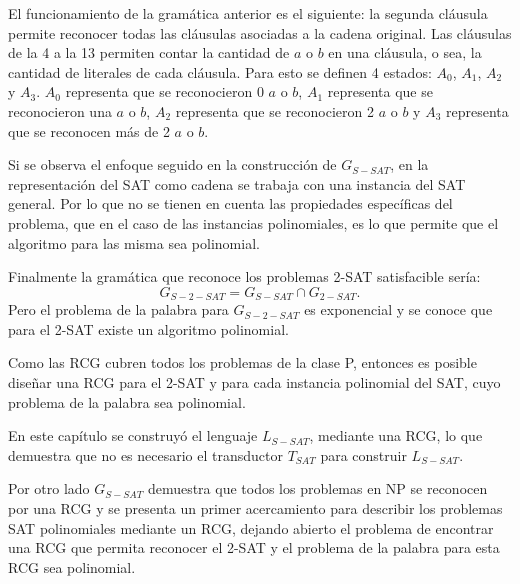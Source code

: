 \documentclass[12pt]{article}
\begin{document}
El funcionamiento de la gramática anterior es el siguiente: la segunda cláusula permite reconocer todas las
cláusulas asociadas a la cadena original. Las cláusulas de la 4 a la 13 permiten contar la cantidad de $a$ o $b$ en
una cláusula, o sea, la cantidad de literales de cada cláusula. Para esto se definen 4 estados: $A_0$, $A_1$, $A_2$ y $A_3$.
$A_0$ representa que se reconocieron 0 $a$ o $b$, $A_1$ representa que se reconocieron una $a$ o $b$, $A_2$
representa que se reconocieron 2 $a$ o $b$ y  $A_3$ representa que se reconocen más de 2 $a$ o $b$.

Si se observa el enfoque seguido en la construcción de $G_{S-SAT}$, en la representación del SAT como cadena se
trabaja con una instancia del SAT general. Por lo que no se tienen en cuenta las propiedades específicas
del problema, que en el caso de las instancias polinomiales, es lo que permite que el algoritmo para
las misma sea polinomial.

Finalmente la gramática que reconoce los problemas 2-SAT satisfacible sería:
$$G_{S-2-SAT}=G_{S-SAT}\cap G_{2-SAT}.$$
Pero el problema de la palabra para $G_{S-2-SAT}$ es exponencial y se conoce que para el 2-SAT existe un algoritmo
polinomial.

Como las RCG cubren todos los problemas de la clase P, entonces es posible
diseñar una RCG para el 2-SAT y para cada instancia polinomial del SAT, cuyo problema de la palabra sea polinomial.

En este capítulo se construyó el lenguaje $L_{S-SAT}$, mediante una RCG, lo que demuestra que no es necesario el transductor $T_{SAT}$ para construir $L_{S-SAT}$.

Por otro lado $G_{S-SAT}$ demuestra que todos los problemas en NP se reconocen por una RCG y se presenta un primer
acercamiento para describir los problemas SAT polinomiales mediante un RCG, dejando abierto el problema de
encontrar una RCG que permita reconocer el 2-SAT y el problema de la palabra para esta RCG sea polinomial.
\end{document}
